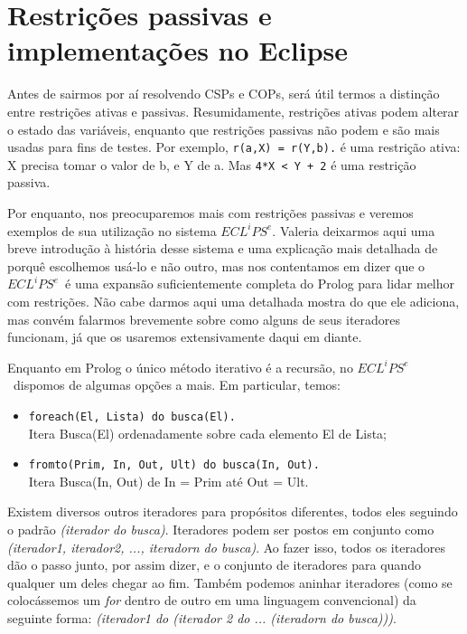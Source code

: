 \documentclass{article}
\newcommand{\eclipse}{$ECL^iPS^e$}
\begin{document}
\section{Restrições passivas e implementações no Eclipse}

Antes de sairmos por aí resolvendo CSPs e COPs, será útil termos a distinção entre restrições ativas e passivas. Resumidamente, restrições ativas podem alterar o estado das variáveis, enquanto que restrições passivas não podem e são mais usadas para fins de testes. Por exemplo, {\tt r(a,X) = r(Y,b).} é uma restrição ativa: X precisa tomar o valor de b, e Y de a. Mas {\tt 4*X < Y + 2} é uma restrição passiva.

Por enquanto, nos preocuparemos mais com restrições passivas e veremos exemplos de sua utilização no sistema \eclipse. Valeria deixarmos aqui uma breve introdução à história desse sistema e uma explicação mais detalhada de porquê escolhemos usá-lo e não outro, mas nos contentamos em dizer que o \eclipse\ é uma expansão suficientemente completa do Prolog para lidar melhor com restrições. Não cabe darmos aqui uma detalhada mostra do que ele adiciona, mas convém falarmos brevemente
sobre como alguns de seus iteradores funcionam, já que os usaremos extensivamente daqui em diante.

Enquanto em Prolog o único método iterativo é a recursão, no \eclipse\ dispomos de algumas opções a mais. Em particular, temos:

\begin{itemize}
  \item {\tt foreach(El, Lista) do busca(El).}
    \\ Itera Busca(El) ordenadamente sobre cada elemento El de Lista;
  \item {\tt fromto(Prim, In, Out, Ult) do busca(In, Out).}
    \\ Itera Busca(In, Out) de In = Prim até Out = Ult.
\end{itemize}

Existem diversos outros iteradores para propósitos diferentes, todos eles seguindo o padrão  \textit{(iterador do busca)}. Iteradores podem ser postos em conjunto como \textit{(iterador1, iterador2, ..., iteradorn do busca)}. Ao fazer isso, todos os iteradores dão o passo junto, por assim dizer, e o conjunto de iteradores para quando qualquer um deles chegar ao fim. Também podemos aninhar iteradores (como se colocássemos um \textit{for} dentro de outro em uma linguagem
convencional) da seguinte forma: \textit{(iterador1 do (iterador 2 do ... (iteradorn do busca)))}.
\end{document}
